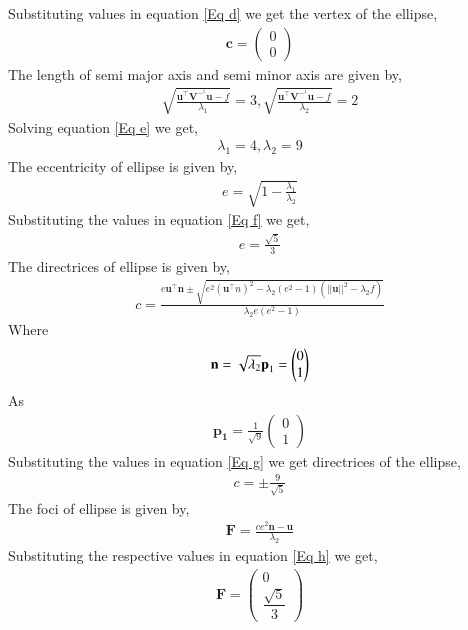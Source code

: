 \documentclass[twocolumn]{article}
\theoremstyle{remark}
\newcommand{\myvec}[1]{\ensuremath{\begin{pmatrix}#1\end{pmatrix}}}
\numberwithin{equation}{subsection}
\let\vec\mathbf
\begin{document}
Substituting values in equation \eqref{Eq d} we get the vertex of the ellipse,
\begin{align}
\vec{c}=\myvec{0 \\ 0}
\end{align}
The length of semi major axis and semi minor axis are given by,
\begin{align} \label{Eq e}
\sqrt{\frac{\textbf{u}^\top \textbf{V}^-^1 \textbf{u} - f}{ \lambda_1}} = 3   ,   \sqrt{\frac{\textbf{u}^\top \textbf{V}^-^1 \textbf{u} - f}{ \lambda_2}} = 2
 \end{align}
Solving equation \eqref{Eq e} we get,
\begin{align} 
\lambda_1 = 4   ,   \lambda_2 = 9
\end{align}
The eccentricity of ellipse is given by,
\begin{align} \label{Eq f}
e = \sqrt{1 - \frac{\lambda_1}{\lambda_2}}
\end{align}
Substituting the values in equation \eqref{Eq f} we get,
\begin{align}
e = \frac{\sqrt{5}}{3}
\end{align}
The directrices of ellipse is given by,
\begin{align} \label{Eq g}
c = \frac{e \textbf{u}^\top \textbf{n} \pm \sqrt{e^2 (\textbf{u}^\top n)^2 - \lambda_2 (e^2 - 1) (||\textbf{u}||^2 - \lambda_2 f)}}{\lambda_2 e (e^2 - 1)}
\end{align}
Where
\begin{align}
\vec{n} = \sqrt{\lambda_2} \textbf p_1 = \myvec{0 \\ 1}
\end{align}
As
\begin{align}
 \vec{p_1} = \frac{1}{\sqrt{9}} \myvec{0 \\ 1}
\end{align}
Substituting the values in equation \eqref{Eq g} we get directrices of the ellipse,
\begin{align}
c = \pm \frac{9}{\sqrt{5}}
\end{align}
The foci of ellipse is given by,
\begin{align} \label{Eq h}
\textbf{F} = \frac{c e^2 \textbf{n} - \textbf{u}}{\lambda_2}
\end{align}
Substituting the respective values in equation \eqref{Eq h} we get,
\begin{align}
\vec{F}=\myvec{0 \\ \dfrac{\sqrt{5}}{3}}
\end{align}
\end{document}
